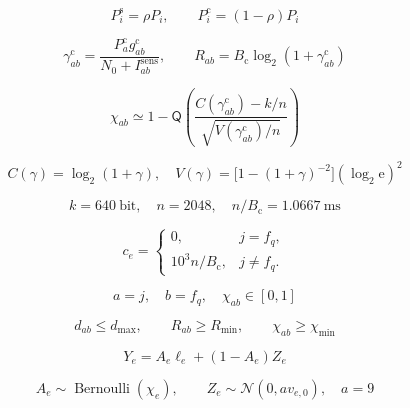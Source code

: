 \documentclass[12pt]{article}
\begin{document}
\begin{equation*}\displaystyle P_i^{\mathrm s}=\rho P_i,\qquad P_i^{\mathrm c}=(1-\rho)P_i\end{equation*}

\begin{equation*}\displaystyle \gamma_{ab}^{\mathrm c}=\frac{P_a^{\mathrm c}g_{ab}^{\mathrm c}}{N_0+I_{ab}^{\mathrm{sens}}},\qquad R_{ab}=B_{\mathrm c}\log_2(1+\gamma_{ab}^{\mathrm c})\end{equation*}

\begin{equation*}\displaystyle \chi_{ab}\simeq1-\mathsf Q\!\left(\frac{C(\gamma_{ab}^{\mathrm c})-k/n}{\sqrt{V(\gamma_{ab}^{\mathrm c})/n}}\right)\end{equation*}

\begin{equation*}\displaystyle C(\gamma)=\log_2(1+\gamma),\quad V(\gamma)=\bigl[1-(1+\gamma)^{-2}\bigr](\log_2\mathrm e)^2\end{equation*}

\begin{equation*}\displaystyle k=640\ \mathrm{bit},\quad n=2048,\quad n/B_{\mathrm c}=1.0667\ \mathrm{ms}\end{equation*}

\begin{equation*}\displaystyle c_e=\begin{cases}0,&j=f_q,\\[3pt]10^3n/B_{\mathrm c},&j\ne f_q.\end{cases}\end{equation*}

\begin{equation*}\displaystyle a=j,\quad b=f_q,\quad\chi_{ab}\in[0,1]\end{equation*}

\begin{equation*}\displaystyle d_{ab}\le d_{\max},\qquad R_{ab}\ge R_{\min},\qquad\chi_{ab}\ge\chi_{\min}\end{equation*}

\begin{equation*}\displaystyle Y_e=A_e\ell_e+(1-A_e)Z_e\end{equation*}

\begin{equation*}\displaystyle A_e\sim\operatorname{Bernoulli}(\chi_e),\qquad Z_e\sim\mathcal N(0,a v_{e,0}),\quad a=9\end{equation*}
\end{document}
